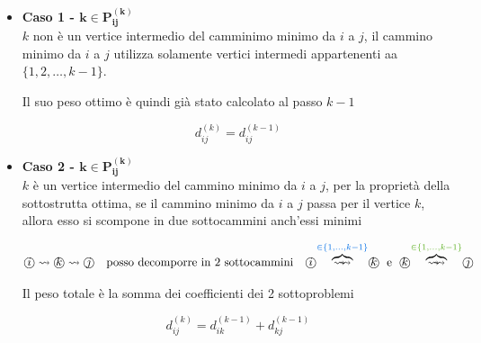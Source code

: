 \begin{itemize}
    \item \textbf{Caso 1 - $\mathbf{k \in P_{ij}^{(k)}}$}\\
    $k$ non è un vertice intermedio del camminimo minimo da $i$ a $j$, il cammino minimo da $i$ a $j$ utilizza solamente vertici intermedi appartenenti aa $\{1,2,\dots,k-1\}$.

    \begin{center}
    \end{center}

    Il suo peso ottimo è quindi già stato calcolato al passo $k-1$

    {
        \large

        $$
            d_{ij}^{(k)} = d_{ij}^{(k-1)}
        $$
    }

    \item \textbf{Caso 2 - $\mathbf{k \in P_{ij}^{(k)}}$}\\
    $k$ è un vertice intermedio del cammino minimo da $i$ a $j$, per la proprietà della sottostrutta ottima, se il cammino minimo da $i$ a $j$ passa per il vertice $k$, allora esso si scompone in due sottocammini anch'essi minimi

    \[
    \text{\textcircled{$i$}} \leadsto \text{\textcircled{$k$}} \leadsto \text{\textcircled{$j$}}
    \quad \text{posso decomporre in 2 sottocammini} \quad
    \text{\textcircled{$i$}} \overset{\textcolor{azzurro}{\in \{1, \dots, k-1\}}}{\overbrace{\leadsto\!\!\!\leadsto}} \text{\textcircled{$k$}}
    \;\text{ e }\;
    \text{\textcircled{$k$}} \overset{\textcolor{verde}{\in \{1, \dots, k-1\}}}{\overbrace{\leadsto\!\!\!\leadsto}} \text{\textcircled{$j$}}
    \]

    Il peso totale è la somma dei coefficienti dei 2 sottoproblemi

    {
        \large

        $$
        d_{ij}^{(k)} = d_{ik}^{(k-1)} + d_{kj}^{(k-1)} 
        $$
    }
\end{itemize}


